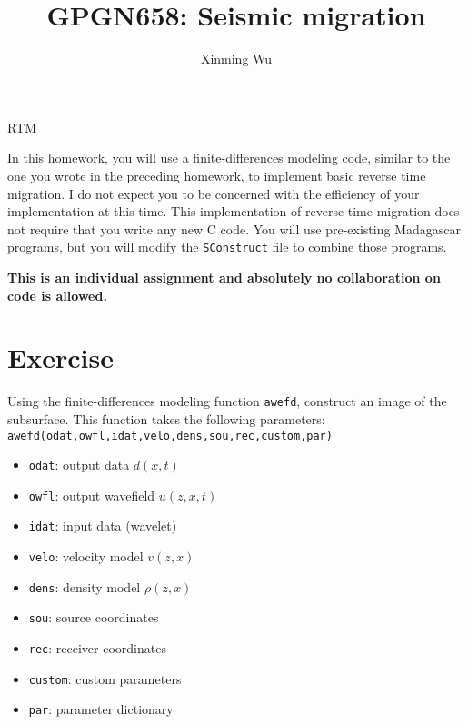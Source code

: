 \author{Xinming Wu}
\title{GPGN658: Seismic migration}{RTM}

In this homework, you will use a finite-differences modeling code,
similar to the one you wrote in the preceding homework, to implement
basic reverse time migration. I do not expect you to be concerned with
the efficiency of your implementation at this time. This
implementation of reverse-time migration does not require that you
write any new C code. You will use pre-existing Madagascar programs,
but you will modify the \texttt{SConstruct} file to combine those
programs.

\textbf{This is an individual assignment and absolutely no
  collaboration on code is allowed.}


\section{Exercise}

Using the finite-differences modeling function \texttt{awefd},
construct an image of the subsurface. This function takes the
following parameters: \\
\texttt{awefd(odat,owfl,idat,velo,dens,sou,rec,custom,par)}
\begin{itemize}
\item \texttt{odat}: output data $d\left( x,t \right)$
\item \texttt{owfl}: output wavefield $u \left( z,x,t \right)$
\item \texttt{idat}: input data (wavelet)
\item \texttt{velo}: velocity model $v \left( z,x \right)$
\item \texttt{dens}: density model $\rho \left( z,x \right)$
\item \texttt{sou}: source coordinates
\item \texttt{rec}: receiver coordinates
\item \texttt{custom}: custom parameters
\item\texttt{par}: parameter dictionary
\end{itemize}

